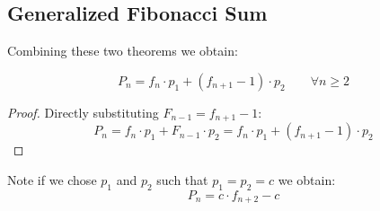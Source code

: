 \subsection{Generalized Fibonacci Sum}\label{fib:subsec:generalized-fibonacci-sum}
Combining these two theorems we obtain:

\begin{theorem}
\[
P_n = f_n \cdot p_1 + (f_{n+1} - 1) \cdot p_2 \qquad \forall n \geq 2
\]
\end{theorem}

\begin{proof}
Directly substituting $F_{n-1} = f_{n+1} - 1$:
\[
P_n = f_n \cdot p_1 + F_{n-1} \cdot p_2 = f_n \cdot p_1 + (f_{n+1} - 1) \cdot p_2
\]
\end{proof}

Note if we chose $p_1$ and $p_2$ such that $p_1 = p_2 = c$ we obtain:
\begin{equation}
P_n = c \cdot f_{n+2} - c \label{fib:eq:equation8}
\end{equation}
